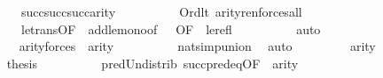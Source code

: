 \begin{isabellebody}
\ \ \ \ \ \ \ \ {\isachardoublequoteopen}{}\ {\isasymle}\ succ{\isacharparenleft}{\kern0pt}succ{\isacharparenleft}{\kern0pt}succ{\isacharparenleft}{\kern0pt}arity{\isacharparenleft}{\kern0pt}{\isasymphi}{\isacharparenright}{\kern0pt}{\isacharparenright}{\kern0pt}{\isacharparenright}{\kern0pt}{\isacharparenright}{\kern0pt}{\isachardoublequoteclose}\isanewline
\ \ \ \ \ \ \ \ \isamarkupfalse%
\ Ord{\isacharunderscore}{\kern0pt}{}{\isacharunderscore}{\kern0pt}lt\ arity{\isacharunderscore}{\kern0pt}ren{\isacharunderscore}{\kern0pt}forces{\isacharunderscore}{\kern0pt}all\isanewline
\ \ \ \ \ \ \ \ \ \ le{\isacharunderscore}{\kern0pt}trans{\isacharbrackleft}{\kern0pt}OF\ {\isacharunderscore}{\kern0pt}\ add{\isacharunderscore}{\kern0pt}le{\isacharunderscore}{\kern0pt}mono{\isacharbrackleft}{\kern0pt}of\ {}\ {}{\isacharcomma}{\kern0pt}\ OF\ {\isacharunderscore}{\kern0pt}\ le{\isacharunderscore}{\kern0pt}refl{\isacharbrackright}{\kern0pt}{\isacharbrackright}{\kern0pt}\isanewline
\ \ \ \ \ \ \ \ \isamarkupfalse%
\ auto\isanewline
\ \ \ \ \ \ \isamarkupfalse%
\ {\isacartoucheopen}{\isasymphi}{\isasymin}{\isacharunderscore}{\kern0pt}{\isacartoucheclose}\isanewline
\ \ \ \ \ \ \isamarkupfalse%
\ {\isachardoublequoteopen}{}\ {\isasymunion}\ arity{\isacharparenleft}{\kern0pt}forces{\isacharprime}{\kern0pt}{\isacharparenleft}{\kern0pt}{\isasymphi}{\isacharparenright}{\kern0pt}{\isacharparenright}{\kern0pt}\ {\isasymle}\ {}{\isacharhash}{\kern0pt}{\isacharplus}{\kern0pt}arity{\isacharparenleft}{\kern0pt}{\isasymphi}{\isacharparenright}{\kern0pt}{\isachardoublequoteclose}\isanewline
\ \ \ \ \ \ \ \ \isamarkupfalse%
\ nat{\isacharunderscore}{\kern0pt}simp{\isacharunderscore}{\kern0pt}union\ \isamarkupfalse%
\ auto\isanewline
\ \ \ \ \ \ \isamarkupfalse%
\ {\isacartoucheopen}{\isasymphi}{\isasymin}{\isacharunderscore}{\kern0pt}{\isacartoucheclose}\ {\isacartoucheopen}arity{\isacharparenleft}{\kern0pt}{\isacharquery}{\kern0pt}{\isasymphi}{\isacharprime}{\kern0pt}{\isacharparenright}{\kern0pt}\ {\isacharequal}{\kern0pt}\ {}\ {\isasymunion}\ {\isacharunderscore}{\kern0pt}{\isacartoucheclose}\isanewline
\ \ \ \ \ \ \isamarkupfalse%
\ {\isacharquery}{\kern0pt}thesis\isanewline
\ \ \ \ \ \ \ \ \isamarkupfalse%
\ pred{\isacharunderscore}{\kern0pt}Un{\isacharunderscore}{\kern0pt}distrib\ succ{\isacharunderscore}{\kern0pt}pred{\isacharunderscore}{\kern0pt}eq{\isacharbrackleft}{\kern0pt}OF\ {\isacharunderscore}{\kern0pt}\ {\isacartoucheopen}arity{\isacharparenleft}{\kern0pt}{\isasymphi}{\isacharparenright}{\kern0pt}{\isasymnoteq}{}{\isacartoucheclose}{\isacharbrackright}{\kern0pt}\isanewline

\end{isabellebody}
